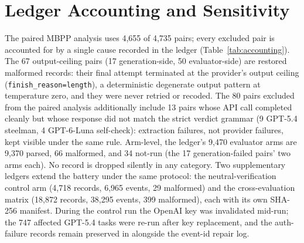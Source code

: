 \documentclass[a4paper,journal]{IAENGtran}
\begin{document}
\appendices

\section{Ledger Accounting and Sensitivity}
\label{app:accounting}

The paired MBPP analysis uses 4,655 of 4,735 pairs; every excluded pair is accounted
for by a single cause recorded in the ledger (Table~\ref{tab:accounting}). The 67
output-ceiling pairs (17 generation-side, 50 evaluator-side) are restored malformed
records: their final attempt terminated at the provider's output ceiling
(\texttt{finish\_reason=length}), a deterministic degenerate output pattern at
temperature zero, and they were never retried or recoded. The 80 pairs excluded from
the paired analysis additionally include 13 pairs whose API call completed cleanly but
whose response did not match the strict verdict grammar (9 GPT-5.4 steelman, 4
GPT-6-Luna self-check): extraction failures, not provider failures, kept visible under
the same rule. Arm-level, the ledger's 9,470 evaluator arms are 9,370 parsed, 66
malformed, and 34 not-run (the 17 generation-failed pairs' two arms each). No record
is dropped silently in any category. Two supplementary ledgers extend the battery
under the same protocol: the neutral-verification control arm (4,718 records, 6,965
events, 29 malformed) and the cross-evaluation matrix (18,872 records, 38,295 events,
399 malformed), each with its own SHA-256 manifest. During the control run the OpenAI
key was invalidated mid-run; the 747 affected GPT-5.4 tasks were re-run after key
replacement, and the auth-failure records remain preserved in
 alongside the event-id repair log.

\begin{table}[!t]
\centering
\caption{MBPP fixed-denominator accounting, 4,735 pairs. Categories are
disjoint and exhaustive; every excluded pair has exactly one ledger-recorded
cause. ``Grammar'' means the API call completed cleanly but the response
carried no strict terminal verdict.}
\label{tab:accounting}
\end{table}
\end{document}
